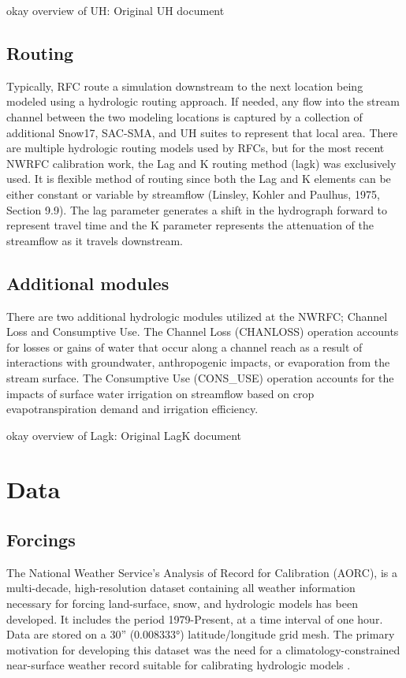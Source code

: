 \documentclass{agujournal2019}
\begin{document}
okay overview of UH:
\cite{unithg_manual2002}
Original UH document
\cite{linsley1982hydrology}

\subsection{Routing}

Typically, RFC route a simulation downstream to the next location being modeled using a hydrologic routing approach. If needed, any flow into the stream channel between the two modeling locations is captured by a collection of additional Snow17, SAC-SMA, and UH suites to represent that local area. There are multiple hydrologic routing models used by RFCs, but for the most recent NWRFC calibration work, the Lag and K routing method (lagk) was exclusively used. It is flexible method of routing since both the Lag and K elements can be either constant or variable by streamflow (Linsley, Kohler and Paulhus, 1975, Section 9.9). The lag parameter generates a shift in the hydrograph forward to represent travel time and the K parameter represents the attenuation of the streamflow as it travels downstream. 

\subsection{Additional modules}

There are two additional hydrologic modules utilized at the NWRFC; Channel Loss and Consumptive Use. The Channel Loss (CHANLOSS) operation accounts for losses or gains of water that occur along a channel reach as a result of interactions with groundwater, anthropogenic impacts, or evaporation from the stream surface. The Consumptive Use (CONS\_USE) operation accounts for the impacts of surface water irrigation on streamflow based on crop evapotranspiration demand and irrigation efficiency.

okay overview of Lagk:
\cite{lagk_manual2002}
Original LagK document
\cite{linsley1982hydrology}

\section{Data}

\subsection{Forcings}

The National Weather Service's Analysis of Record for Calibration (AORC), is a multi-decade, high-resolution dataset containing all weather information necessary for forcing land-surface, snow, and hydrologic models has been developed. It includes the period 1979-Present, at a time interval of one hour. Data are stored on a 30” (0.008333°) latitude/longitude grid mesh. The primary motivation for developing this dataset was the need for a climatology-constrained near-surface weather record suitable for calibrating hydrologic models \cite{Fall_2023}. 
\end{document}
